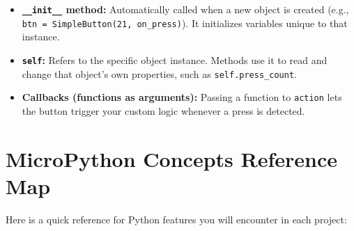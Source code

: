 \begin{itemize}
    \item \textbf{\texttt{\_\_init\_\_} method:} Automatically called when a new object is created (e.g.,
    \texttt{btn = SimpleButton(21, on\_press)}). It initializes variables unique to that instance.
    \item \textbf{\texttt{self}:} Refers to the specific object instance. Methods use it to read and change
    that object's own properties, such as \texttt{self.press\_count}.
    \item \textbf{Callbacks (functions as arguments):} Passing a function to \texttt{action} lets the button
    trigger your custom logic whenever a press is detected.
\end{itemize}


\section{MicroPython Concepts Reference Map}

Here is a quick reference for Python features you will encounter in each project:

